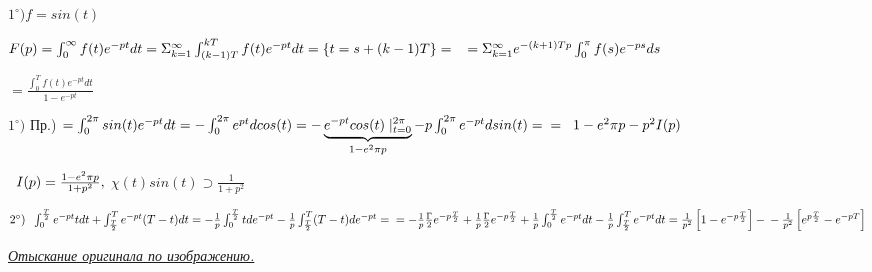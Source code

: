 \vspace{0.5cm}
$1^{\circ}) f = sin(t) $ 

\vspace{0.5cm}
{\Large $F(p) = \int_0^\infty f(t)e^{-pt}dt = \Sigma_{k=1}^\infty \int_{(k-1)T}^{kT} f(t)e^{-pt} dt = \lbrace t = s + (k-1)T\rbrace = \\ \text{\hspace{0.2cm}} = \Sigma_{k=1}^\infty e^{-(k+1)Tp} \int_0^\pi f(s) e^{-ps} ds$}
\begin{LARGE}
$ = \frac{\int_0^T f(t)e^{-pt}dt}{1 - e^{-pt}}$
\end{LARGE}

\vspace{0.5cm}
\begin{large}
$1^{\circ})$ Пр.) $ = \int_0^{2\pi} sin(t) e^{-pt} dt = - \int_0^{2\pi} e^{pt} d cos(t) = -\underbrace{e^{-pt}cos(t)\mid_{t=0}^{2\pi} }_{1-e^2\pi p} - p\int_0^{2\pi}e^{-pt} d sin(t)  
=\\ =\text{\hspace{0.2cm}} 1-e^2\pi p - p^2 I(p)$
\end{large}

\vspace{0.5cm}
\begin{Large}
$
\text{\hspace{0.2cm}} I(p) = \frac{1-e^2\pi p}{1+p^2},
$
\hspace{0.8cm}
$
\chi(t)sin(t)\supset \frac{1}{1+p^2}
$

\end{Large}

\vspace{0.5cm}
\begin{Large}
$2^{\circ}) \text{\hspace{0.2cm}} \int_0^{\frac{T}{2}}e^{-pt}tdt + \int_{\frac{T}{2}}^T e^{-pt}(T -t)dt = 
-\frac{1}{p}\int_0^{\frac{T}{2}} t de^{-pt} -\frac{1}{p} \int_{\frac{T}{2}}^T (T - t) de^{-pt} = \\ =
-\frac{1}{p}\frac{\Gamma}{2}e^{-p\frac{T}{2}} + \frac{1}{p}\frac{\Gamma}{2}e^{-p\frac{T}{2}} + \frac{1}{p}\int_0^{\frac{T}{2}} e^{-pt} dt - \frac{1}{p}\int_{\frac{T}{2}}^T e^{-pt}dt =
\frac{1}{p^2}\left[1-e^{-p\frac{T}{2}}\right] - \\ - \frac{1}{p^2}\left[e^{p\frac{T}{2}} - e^{-pT}\right]
$
\end{Large}

\newpage
\begin{LARGE}
\textit{\underline{Отыскание оригинала по изображению.}}
\end{LARGE}

